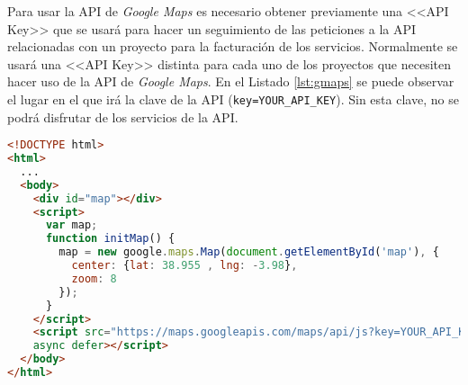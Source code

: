 Para usar la \ac{API} de \textit{Google Maps} es necesario obtener previamente una <<\ac{API} Key>> que se usará para hacer un seguimiento de las peticiones a la \ac{API} relacionadas con un proyecto para la facturación de los servicios. Normalmente se usará una <<\ac{API} Key>> distinta para cada uno de los proyectos que necesiten hacer uso de la \ac{API} de \textit{Google Maps}. En el Listado \ref{lst:gmaps} se puede observar el lugar en el que irá la clave de la \ac{API} (\lstinline[columns=fixed]{key=YOUR_API_KEY}). Sin esta clave, no se podrá disfrutar de los servicios de la \ac{API}.

\begin{lstlisting}[language=html,captionpos=t,caption={\textbf{Ejemplo básico del uso de la \ac{API} de \textit{Google Maps}, para visualizar en un mapa Ciudad Real.}},label={lst:gmaps}]
<!DOCTYPE html>
<html>
  ...
  <body>
    <div id="map"></div>
    <script>
      var map;
      function initMap() {
        map = new google.maps.Map(document.getElementById('map'), {
          center: {lat: 38.955 , lng: -3.98},
          zoom: 8
        });
      }
    </script>
    <script src="https://maps.googleapis.com/maps/api/js?key=YOUR_API_KEY&callback=initMap"
    async defer></script>
  </body>
</html>
\end{lstlisting}

